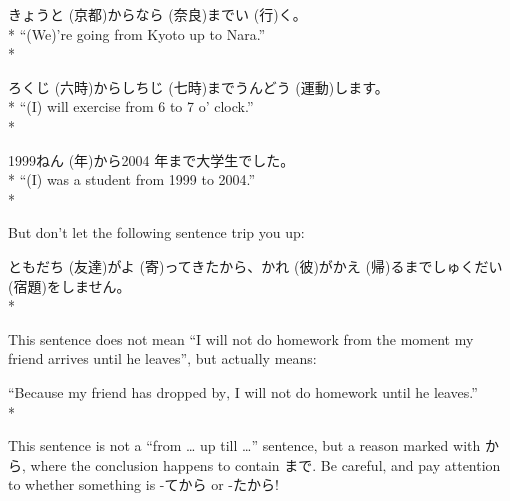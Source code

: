 \documentclass[11pt, b5paper, twoside, openright, onecolumn]{book}
\makeatletter
\newcommand*{\rubystack}[2]{{\relscale{0.5}%
  \begin{tabular}[b]{@{}c@{}}%
    {#1}\\%
   {\textscale{2}{#2}}%
  \end{tabular}}%
}
\DeclareRobustCommand*{\ruby}[2]{%
  \mbox{%
    \setlength{\parskip}{0ex}%
    \BeginAccSupp{method=pdfstringdef,ActualText={#1}}%
      \rubystack{\phantom{#2}}{#1}%
      \llap{%
        \rubystack{#2}{\phantom{#1}}%
      }%
    \EndAccSupp{}%
  }%
}
\renewcommand*{\ruby}[2]{#2 (#1)}%
\newenvironment{exampleblock}{
\setlength{\parindent}{0.6in}
\begin{minipage}[t]{\dimexpr\textwidth-\parindent}}
{\end{minipage}}
\makeatother
\begin{document}
\vspace{0.4cm}
\begin{exampleblock}
\ruby{京都}{きょうと}から\ruby{奈良}{なら}まで\ruby{行}{い}く。 \\* 
“(We)’re going from Kyoto up to Nara.” \\* 
\end{exampleblock}
\vspace{0.2cm}

\begin{exampleblock}
\ruby{六時}{ろくじ}から\ruby{七時}{しちじ}まで\ruby{運動}{うんどう}します。 \\* 
“(I) will exercise from 6 to 7 o’ clock.” \\* 
\end{exampleblock}
\vspace{0.2cm}

\begin{exampleblock}
1999\ruby{年}{ねん}から2004 年まで大学生でした。 \\* 
“(I) was a student from 1999 to 2004.” \\* 
\end{exampleblock}
\vspace{0.2cm}

But don’t let the following sentence trip you up:

\vspace{0.4cm}
\begin{exampleblock}
\ruby{友達}{ともだち}が\ruby{寄}{よ}ってきたから、\ruby{彼}{かれ}が\ruby{帰}{かえ}るまで\ruby{宿題}{しゅくだい}をしません。 \\* 
\end{exampleblock}
\vspace{0.2cm}

This sentence does not mean “I will not do homework from the moment my friend arrives until he leaves”‚ but actually means:

\vspace{0.4cm}
\begin{exampleblock}
“Because my friend has dropped by‚ I will not do homework until he leaves.” \\* 
\end{exampleblock}
\vspace{0.2cm}

This sentence is not a “from … up till …” sentence‚ but a reason marked with から‚ where the conclusion happens to contain まで. Be careful‚ and pay attention to whether something is -てから or -たから!
\end{document}
